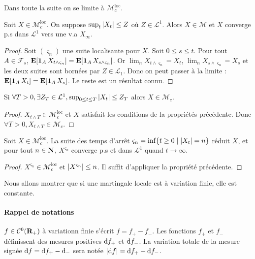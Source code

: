 	Dans toute la suite on se limite à $\mathcal{M}^{\text{loc}}_c$.
	
	\begin{pop}
		Soit $X \in \mathcal{M}^{\text{loc}}_c$.
		On suppose $\sup_t \left\lvert X_t\right\rvert \leq Z$ où $Z \in \mathcal{L}^1$.
		Alors $X \in \mathcal{M}$ et $X$ converge p.s dans $\mathcal{L}^1$ vers une v.a $X_\infty$.
	\end{pop}
	
	\begin{proof}
		Soit $(\varsigma_n)$ une suite localisante pour $X$.
		Soit $0 \leq s \leq t$.
		Pour tout $A \in \mathcal{F}_s$, $\mathbf{E}[\operatorname{\mathbf{1}}_A X_{t \wedge \varsigma_n}] = \mathbf{E}[\operatorname{\mathbf{1}}_A X_{s \wedge \varsigma_n}]$.
		Or $\lim_n X_{t \wedge \varsigma_n} = X_t$, $\lim_n X_{s \wedge \varsigma_n} = X_s$ et les deux suites sont bornées par $Z \in \mathcal{L}_1$.
		Donc on peut passer à la limite : $\mathbf{E}[\operatorname{\mathbf{1}}_A X_t] = \mathbf{E}[\operatorname{\mathbf{1}}_A X_s]$.
		Le reste est un résultat connu.
	\end{proof}
	
	\begin{cor}
		Si $\forall T > 0, \exists Z_T \in \mathcal{L}^1, \sup_{0 \leq t \leq T} \left\lvert X_t\right\rvert \leq Z_T$ alors $X \in \mathcal{M}_c$.
	\end{cor}
	
	\begin{proof}
		$X_{t \wedge T} \in \mathcal{M}^{\text{loc}}_c$ et $X$ satisfait les conditions de la propriétés précédente.
		Donc $\forall T > 0, X_{t \wedge T} \in \mathcal{M}_c$.
	\end{proof}
	
	\begin{cor}
		Soit $X \in \mathcal{M}^{\text{loc}}_c$.
		La suite des temps d'arrêt $\varsigma_n = \inf \{ t \geq 0 \mid \left\lvert X_t\right\rvert = n \}$ réduit $X$, et pour tout $n \in \mathbf{N}$, $X^{\varsigma_n}$ converge p.s et dans $\mathcal{L}^1$ quand $t \longrightarrow \infty$.
	\end{cor}
	
	\begin{proof}
		$X^{\varsigma_n} \in \mathcal{M}^{\text{loc}}_c$ et $\left\lvert X^{\varsigma_n}\right\rvert \leq n$.
		Il suffit d'appliquer la propriété précédente.
	\end{proof}
	
	Nous allons montrer que si une martingale locale est à variation finie, elle est constante.
	
	\paragraph{Rappel de notations} $f \in \mathcal{C}^0(\mathbf{R}_+)$ à variationn finie s'écrit $f = f_+ - f_-$.
	Les fonctions $f_+$ et $f_-$ définissent des mesures positives $\mathop{}\mathopen{}\mathrm{d} f_+$ et $\mathop{}\mathopen{}\mathrm{d} f_-$.
	La variation totale de la mesure signée $\mathop{}\mathopen{}\mathrm{d} f = \mathop{}\mathopen{}\mathrm{d} f_+ - \mathop{}\mathopen{}\mathrm{d} _-$ sera notée $\left\lvert\mathop{}\mathopen{}\mathrm{d} f\right\rvert = \mathop{}\mathopen{}\mathrm{d} f_+ + \mathop{}\mathopen{}\mathrm{d} f_-$.
	
